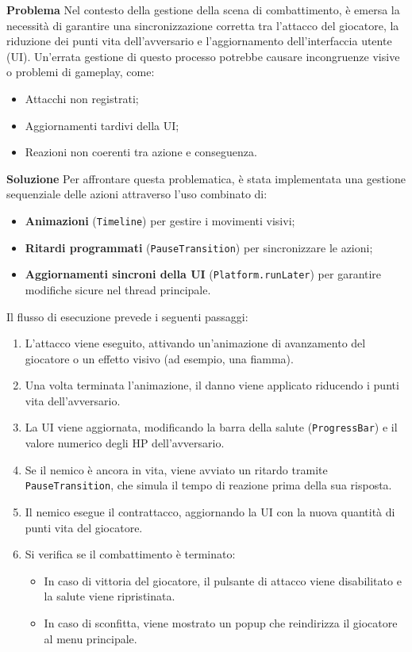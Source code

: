\documentclass[a4paper,12pt]{report}
\begin{document}
\textbf{Problema}
Nel contesto della gestione della scena di combattimento, è emersa la necessità di garantire una sincronizzazione corretta tra l'attacco del giocatore, la riduzione dei punti vita dell'avversario e l'aggiornamento dell'interfaccia utente (UI). Un’errata gestione di questo processo potrebbe causare incongruenze visive o problemi di gameplay, come:
\begin{itemize}
    \item Attacchi non registrati;
    \item Aggiornamenti tardivi della UI;
    \item Reazioni non coerenti tra azione e conseguenza.
\end{itemize}

\textbf{Soluzione}
Per affrontare questa problematica, è stata implementata una gestione sequenziale delle azioni attraverso l'uso combinato di:
\begin{itemize}
    \item \textbf{Animazioni} (\texttt{Timeline}) per gestire i movimenti visivi;
    \item \textbf{Ritardi programmati} (\texttt{PauseTransition}) per sincronizzare le azioni;
    \item \textbf{Aggiornamenti sincroni della UI} (\texttt{Platform.runLater}) per garantire modifiche sicure nel thread principale.
\end{itemize}

Il flusso di esecuzione prevede i seguenti passaggi:
\begin{enumerate}
    \item L’attacco viene eseguito, attivando un'animazione di avanzamento del giocatore o un effetto visivo (ad esempio, una fiamma).
    \item Una volta terminata l’animazione, il danno viene applicato riducendo i punti vita dell’avversario.
    \item La UI viene aggiornata, modificando la barra della salute (\texttt{ProgressBar}) e il valore numerico degli HP dell'avversario.
    \item Se il nemico è ancora in vita, viene avviato un ritardo tramite \texttt{PauseTransition}, che simula il tempo di reazione prima della sua risposta.
    \item Il nemico esegue il contrattacco, aggiornando la UI con la nuova quantità di punti vita del giocatore.
    \item Si verifica se il combattimento è terminato:
    \begin{itemize}
        \item In caso di vittoria del giocatore, il pulsante di attacco viene disabilitato e la salute viene ripristinata.
        \item In caso di sconfitta, viene mostrato un popup che reindirizza il giocatore al menu principale.
    \end{itemize}
\end{enumerate}
\end{document}
